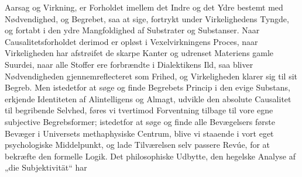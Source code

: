 \documentclass[12pt]{book}
\newcommand{\opage}[1]{\marginnote{\footnotesize\textit{[#1]}}}
\begin{document}
Aarsag og Virkning, er Forholdet imellem det Indre og det Ydre bestemt med Nødvendighed,
og Begrebet, saa at sige, fortrykt under Virkelighedens Tyngde, og fortabt i den ydre
Mangfoldighed af Substrater og Substanser. Naar Causalitetsforholdet derimod er opløst i
Vexelvirkningens Proces, naar Virkeligheden har afstrøifet de skarpe Kanter og udrenset
Materiens gamle Suurdei, naar alle Stoffer ere forbrændte i Dialektikens Ild, saa bliver
Nødvendigheden gjennemreflecteret som Frihed, og Virkeligheden klarer sig til sit
Begreb. Men istedetfor at søge og finde Begrebets Princip i den
\opage{177} %
%
%
%
evige Substans, erkjende Identiteten af Alintelligens og Almagt, udvikle den absolute
Causalitet til begribende Selvhed, føres vi tvertimod Forventning tilbage til vore egne
subjective Begrebsformer; istedetfor at søge og finde alle Bevægelsers første Bevæger i
Universets methaphysiske Centrum, blive vi staaende i vort eget psychologiske
Middelpunkt, og lade Tilværelsen selv passere Revúe, for at bekræfte den formelle
Logik. Det philosophiske Udbytte, den hegelske Analyse af „die Subjektivität“ har
\end{document}
